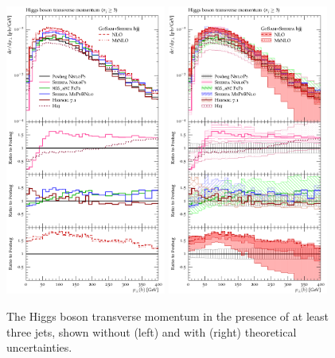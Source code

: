 {\begin{figure}[t!]
  \centering
  \includegraphics[width=0.47\textwidth]{figures/hjetscomp_u_H_jjj_pT_incl.pdf}
  \hfill
  \includegraphics[width=0.47\textwidth]{figures/hjetscomp_H_jjj_pT_incl.pdf}
  \caption{
    The Higgs boson transverse momentum in the presence of at least three 
    jets, shown without (left) and with (right) theoretical uncertainties.
    \label{fig:hjetscomp:results:mobs:hpt_j3}
  }
\end{figure}

}
